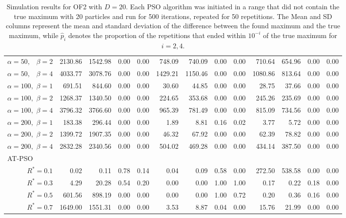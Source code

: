 \documentclass[12pt]{article}
\begin{document}
\begin{appendix}
\begin{table}[ht]
{\begin{tabular}{r|rrrr|rrrr|rrrr}
  $\alpha = 50,\enspace$ $\beta =2$ & 2130.86 & 1542.98 & 0.00 & 0.00 & 748.09 & 740.09 & 0.00 & 0.00 & 710.64 & 654.96 & 0.00 & 0.00 \\ 
  $\alpha = 50,\enspace$ $\beta =4$ & 4033.77 & 3078.76 & 0.00 & 0.00 & 1429.21 & 1150.46 & 0.00 & 0.00 & 1080.86 & 813.64 & 0.00 & 0.00 \\ 
  $\alpha = 100,$ $\beta =1$ & 691.51 & 844.60 & 0.00 & 0.00 & 30.60 & 44.85 & 0.00 & 0.00 & 28.75 & 37.66 & 0.00 & 0.00 \\ 
  $\alpha = 100,$ $\beta =2$ & 1268.37 & 1340.50 & 0.00 & 0.00 & 224.65 & 353.68 & 0.00 & 0.00 & 245.26 & 235.69 & 0.00 & 0.00 \\ 
  $\alpha = 100,$ $\beta =4$ & 3796.32 & 3766.60 & 0.00 & 0.00 & 965.39 & 781.49 & 0.00 & 0.00 & 815.09 & 734.56 & 0.00 & 0.00 \\ 
  $\alpha = 200,$ $\beta =1$ & 183.38 & 296.44 & 0.00 & 0.00 & 1.89 & 8.81 & 0.16 & 0.02 & 3.77 & 5.72 & 0.00 & 0.00 \\ 
  $\alpha = 200,$ $\beta =2$ & 1399.72 & 1907.35 & 0.00 & 0.00 & 46.32 & 67.92 & 0.00 & 0.00 & 62.39 & 78.82 & 0.00 & 0.00 \\ 
  $\alpha = 200,$ $\beta =4$ & 2832.28 & 2340.56 & 0.00 & 0.00 & 504.02 & 469.28 & 0.00 & 0.00 & 434.14 & 387.50 & 0.00 & 0.00 \\ 
\hline
\multicolumn{1}{l|}{AT-PSO} &&&&&&&&&&&&\\
  $R^* = 0.1$ & 0.02 & 0.11 & 0.78 & 0.14 & 0.04 & 0.09 & 0.58 & 0.00 & 272.50 & 538.58 & 0.00 & 0.00 \\ 
  $R^* = 0.3$ & 4.29 & 20.28 & 0.54 & 0.20 & 0.00 & 0.00 & 1.00 & 1.00 & 0.17 & 0.22 & 0.18 & 0.00 \\ 
  $R^* = 0.5$ & 601.56 & 898.19 & 0.00 & 0.00 & 0.00 & 0.00 & 1.00 & 0.72 & 0.20 & 0.36 & 0.16 & 0.00 \\ 
  $R^* = 0.7$ & 1649.00 & 1551.31 & 0.00 & 0.00 & 3.53 & 8.87 & 0.04 & 0.00 & 15.76 & 21.99 & 0.00 & 0.00 \\ 
   \hline
\end{tabular}
}
\caption{Simulation results for OF2 with $D=20$. Each PSO algorithm was initiated in a range that did not contain the true maximum with 20 particles and run for 500 iterations, repeated for 50 repetitions. The Mean and SD columns represent the mean and standard deviation of the difference between the found maximum and the true maximum, while $\widehat{p}_i$ denotes the proportion of the repetitions that ended within $10^{-i}$ of the true maximum for $i=2,4$.}
\label{tab:psosim2}
\end{table}

\end{appendix}
\end{document}
